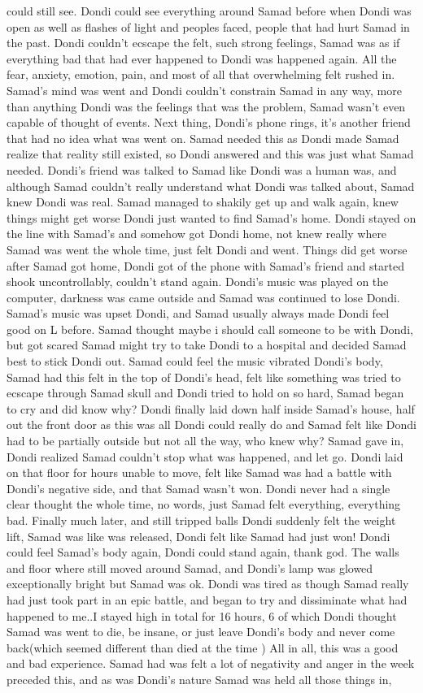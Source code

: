 \documentclass[12pt]{book}
\begin{document}
could still see. Dondi could see everything around Samad before when Dondi was open as well as flashes of light and peoples faced, people that had hurt Samad in the past. Dondi couldn't ecscape the felt, such strong feelings, Samad was as if everything bad that had ever happened to Dondi was happened again. All the fear, anxiety, emotion, pain, and most of all that overwhelming felt rushed in. Samad's mind was went and Dondi couldn't constrain Samad in any way, more than anything Dondi was the feelings that was the problem, Samad wasn't even capable of thought of events. Next thing, Dondi's phone rings, it's another friend that had no idea what was went on. Samad needed this as Dondi made Samad realize that reality still existed, so Dondi answered and this was just what Samad needed. Dondi's friend was talked to Samad like Dondi was a human was, and although Samad couldn't really understand what Dondi was talked about, Samad knew Dondi was real. Samad managed to shakily get up and walk again, knew things might get worse Dondi just wanted to find Samad's home. Dondi stayed on the line with Samad's and somehow got Dondi home, not knew really where Samad was went the whole time, just felt Dondi and went. Things did get worse after Samad got home, Dondi got of the phone with Samad's friend and started shook uncontrollably, couldn't stand again. Dondi's music was played on the computer, darkness was came outside and Samad was continued to lose Dondi. Samad's music was upset Dondi, and Samad usually always made Dondi feel good on L before. Samad thought maybe i should call someone to be with Dondi, but got scared Samad might try to take Dondi to a hospital and decided Samad best to stick Dondi out. Samad could feel the music vibrated Dondi's body, Samad had this felt in the top of Dondi's head, felt like something was tried to ecscape through Samad skull and Dondi tried to hold on so hard, Samad began to cry and did know why? Dondi finally laid down half inside Samad's house, half out the front door as this was all Dondi could really do and Samad felt like Dondi had to be partially outside but not all the way, who knew why? Samad gave in, Dondi realized Samad couldn't stop what was happened, and let go. Dondi laid on that floor for hours unable to move, felt like Samad was had a battle with Dondi's negative side, and that Samad wasn't won. Dondi never had a single clear thought the whole time, no words, just Samad felt everything, everything bad. Finally much later, and still tripped balls Dondi suddenly felt the weight lift, Samad was like was released, Dondi felt like Samad had just won! Dondi could feel Samad's body again, Dondi could stand again, thank god. The walls and floor where still moved around Samad, and Dondi's lamp was glowed exceptionally bright but Samad was ok. Dondi was tired as though Samad really had just took part in an epic battle, and began to try and dissiminate what had happened to me..I stayed high in total for 16 hours, 6 of which Dondi thought Samad was went to die, be insane, or just leave Dondi's body and never come back(which seemed different than died at the time ) All in all, this was a good and bad experience. Samad had was felt a lot of negativity and anger in the week preceded this, and as was Dondi's nature Samad was held all those things in, 
\end{document}
